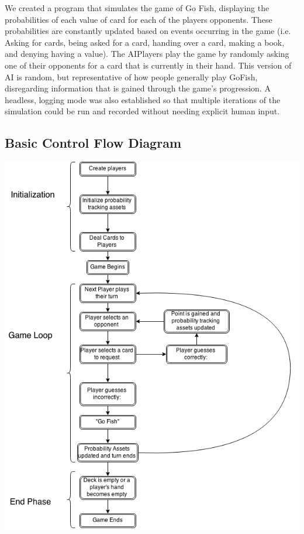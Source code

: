 \documentclass[preprint,12pt]{elsarticle}
\begin{document}
We created a program that simulates the game of Go Fish, displaying the probabilities of each value of card for each of the players opponents. These probabilities are constantly updated based on events occurring in the game (i.e. Asking for cards, being asked for a card, handing over a card, making a book, and denying having a value). The AIPlayers play the game by randomly asking one of their opponents for a card that is currently in their hand. This version of AI is random, but representative of how people generally play GoFish, disregarding information that is gained through the game’s progression. A headless, logging mode was also established so that multiple iterations of the simulation could be run and recorded without needing explicit human input.

\subsection{Basic Control Flow Diagram}
\includegraphics[scale=0.6]{../images/GoFishControlFlow.png}
\end{document}
